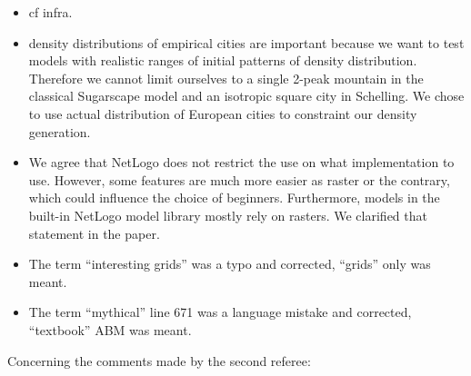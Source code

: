 \documentclass[11pt,a4paper,sans]{moderncv}        %
\begin{document}
\begin{itemize}
	\item cf infra. 
	\item density distributions of empirical cities are important because we want to test models with realistic ranges of initial patterns of density distribution. Therefore we cannot limit ourselves to a single 2-peak mountain in the classical Sugarscape model and an isotropic square city in Schelling. We chose to use actual distribution of European cities to constraint our density generation.
		
	
	\item We agree that NetLogo does not restrict the use on what implementation to use. However, some features are much more easier as raster or the contrary, which could influence the choice of beginners. Furthermore, models in the built-in NetLogo model library mostly rely on rasters. We clarified that statement in the paper.
	
	\item The term ``interesting grids'' was a typo and corrected, ``grids'' only was meant.
	
	\item The term ``mythical'' line 671 was a language mistake and corrected, ``textbook'' ABM was meant.
\end{itemize}




Concerning the comments made by the second referee:

\end{document}
